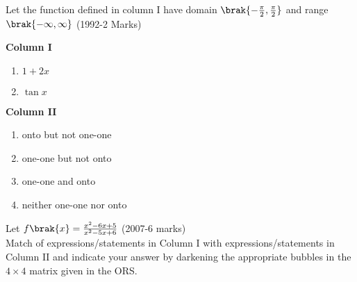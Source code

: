 \iffalse
  \title{Assignment-1}
  \author{Murra Rajesh Kumar Reddy}
  \section{matrix-match}
\fi
\item Let the function defined in column I have domain $\brak{-\frac{\pi}{2},\frac{\pi}{2}}$ and range $\brak{-\infty,\infty}$ \hfill(1992-2 Marks)
			\begin{multicols}{2} 
				\textbf{Column I}
				\begin{enumerate}[label=(\Alph*)]
					\item $1+2x$
					\item $\tan x$
				\end{enumerate}
				\columnbreak
				 \textbf{Column II}
				\begin{enumerate}[label=(\alph*),start=16]
					\item onto but not one-one
					\item one-one but not onto
					\item one-one and onto
					\item neither one-one nor onto
				\end{enumerate}
			\end{multicols}
		\item Let $f\brak{x}=\frac{x^2-6x+5}{x^2-5x+6}$ \hfill(2007-6 marks)
					\\ Match of expressions/statements in Column I with expressions/statements in Column II and indicate your answer by darkening the appropriate bubbles in the $4\times4$ matrix given in the ORS.
	
